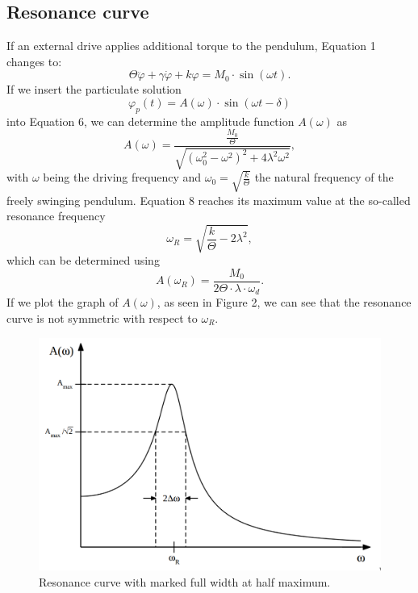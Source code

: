 \documentclass{article}
\begin{document}
\subsection{Resonance curve}
If an external drive applies additional torque to the pendulum, Equation 1 changes to:
\begin{equation}
    \Theta \ddot{\varphi} + \gamma \dot{\varphi} + k\varphi = M_0 \cdot \sin(\omega t).
\end{equation}
If we insert the particulate solution
\begin{equation}
    \varphi_{p}(t)= A(\omega)\cdot \sin(\omega t - \delta)
\end{equation}
into Equation 6, we can determine the amplitude function $A(\omega)$\cite{1} as
\begin{equation}
    A(\omega)= \frac{\frac{M_0}{\Theta}}{\sqrt{(\omega_{0}^2 -\omega^2)^2+4\lambda^2 \omega^2}},
\end{equation}
with $\omega$ being the driving frequency and $\omega_0 = \sqrt{\frac{k}{\Theta}}$ the natural frequency of the freely swinging pendulum. Equation 8 reaches its maximum value at the so-called resonance frequency
\begin{equation}
    \omega_R= \sqrt{\frac{k}{\Theta}-2\lambda^2},
\end{equation}
which can be determined using
\begin{equation}
    A(\omega_R)= \frac{M_0}{2\Theta \cdot \lambda \cdot \omega_d}.
\end{equation}
If we plot the graph of $A(\omega)$, as seen in Figure 2, we can see that the resonance curve is not symmetric with respect to $\omega_R$.
\begin{figure}[hbt!]
\centering
\includegraphics[width=350pt]{res-theory.png}
\caption{Resonance curve with marked full width at half maximum. \cite{1}}
\label{fig:length_eight_mouse}
\end{figure}
\end{document}
